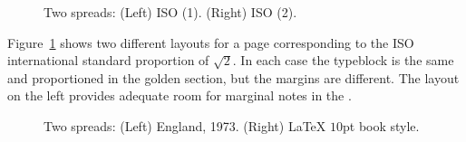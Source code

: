 \documentclass[10pt,a4paper,extrafontsizes]{memoir}
\begin{document}
\begin{figure}
\centering
\begin{minipage}[b]{\pwlayi}
\end{minipage}
\hfill
\begin{minipage}[b]{\pwlayi}
\end{minipage}
\caption[Two spreads for ISO page sizes]%
        {Two spreads: (Left) ISO (1).
         (Right) ISO (2).} \label{fb:12}
\end{figure}

\begin{paracol}{2}
\switchEng
    Figure~\ref{fb:12} shows two different layouts for a page corresponding
to the ISO international standard proportion of $\sqrt{2}$. In each case
the typeblock is the same and proportioned in the 
golden section, but the margins are 
different. The layout on the left provides adequate
room for marginal notes in the \foredge.
\end{paracol}

\begin{figure}
\centering
\begin{minipage}[b]{\pwlayi}
\end{minipage}
\hfill
\begin{minipage}[b]{\pwlayi}
\end{minipage}
\caption[Two spreads: England, 1973 and LaTeX $10pt$ book style]%
        {Two spreads: (Left) England, 1973.
         (Right) LaTeX $10$pt book style.} \label{fb:13}
\end{figure}
\end{document}
